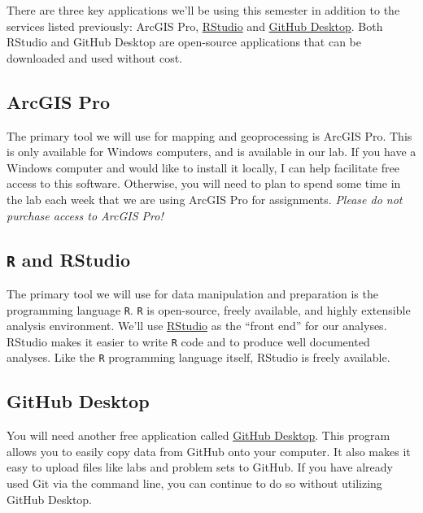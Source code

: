 \documentclass[
]{book}
\begin{document}
There are three key applications we'll be using this semester in addition to the services listed previously: ArcGIS Pro, \href{https://www.rstudio.com}{RStudio} and \href{https://desktop.github.com}{GitHub Desktop}. Both RStudio and GitHub Desktop are open-source applications that can be downloaded and used without cost.

\hypertarget{arcgis-pro}{%
\subsection{ArcGIS Pro}\label{arcgis-pro}}

The primary tool we will use for mapping and geoprocessing is ArcGIS Pro. This is only available for Windows computers, and is available in our lab. If you have a Windows computer and would like to install it locally, I can help facilitate free access to this software. Otherwise, you will need to plan to spend some time in the lab each week that we are using ArcGIS Pro for assignments. \emph{Please do not purchase access to ArcGIS Pro!}

\hypertarget{r-and-rstudio}{%
\subsection{\texorpdfstring{\texttt{R} and RStudio}{R and RStudio}}\label{r-and-rstudio}}

The primary tool we will use for data manipulation and preparation is the programming language \texttt{R}. \texttt{R} is open-source, freely available, and highly extensible analysis environment. We'll use \href{https://www.rstudio.com}{RStudio} as the ``front end'' for our analyses. RStudio makes it easier to write \texttt{R} code and to produce well documented analyses. Like the \texttt{R} programming language itself, RStudio is freely available.

\hypertarget{github-desktop}{%
\subsection{GitHub Desktop}\label{github-desktop}}

You will need another free application called \href{https://desktop.github.com}{GitHub Desktop}. This program allows you to easily copy data from GitHub onto your computer. It also makes it easy to upload files like labs and problem sets to GitHub. If you have already used Git via the command line, you can continue to do so without utilizing GitHub Desktop.
\end{document}
